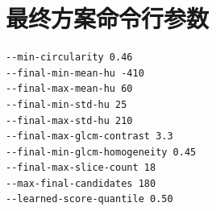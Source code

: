 \documentclass[UTF8,zihao=-4,fontset=none]{ctexart}
\begin{document}
\section{最终方案命令行参数}

\begin{verbatim}
--min-circularity 0.46
--final-min-mean-hu -410
--final-max-mean-hu 60
--final-min-std-hu 25
--final-max-std-hu 210
--final-max-glcm-contrast 3.3
--final-min-glcm-homogeneity 0.45
--final-max-slice-count 18
--max-final-candidates 180
--learned-score-quantile 0.50
\end{verbatim}
\end{document}
